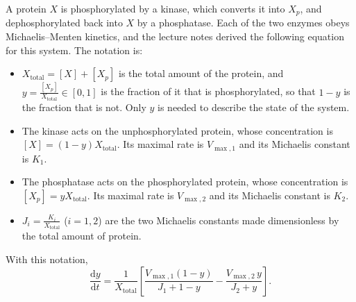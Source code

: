 \documentclass[a4paper,12pt]{article}
\begin{document}
A protein $X$ is phosphorylated by a kinase, which converts it into $X_p$, and dephosphorylated back into $X$ by a phosphatase. Each of the two enzymes obeys Michaelis--Menten kinetics, and the lecture notes derived the following equation for this system. The notation is:
\begin{itemize}
\item $X_{\text{total}} = [X]+[X_p]$ is the total amount of the protein, and $y = \frac{[X_p]}{X_{\text{total}}} \in [0,1]$ is the fraction of it that is phosphorylated, so that $1-y$ is the fraction that is not. Only $y$ is needed to describe the state of the system.
\item The kinase acts on the unphosphorylated protein, whose concentration is $[X] = (1-y)X_{\text{total}}$. Its maximal rate is $V_{\max,1}$ and its Michaelis constant is $K_1$.
\item The phosphatase acts on the phosphorylated protein, whose concentration is $[X_p] = y X_{\text{total}}$. Its maximal rate is $V_{\max,2}$ and its Michaelis constant is $K_2$.
\item $J_i = \frac{K_i}{X_{\text{total}}}$ ($i=1,2$) are the two Michaelis constants made dimensionless by the total amount of protein.
\end{itemize}
With this notation,
\[ \frac{\text{d}y}{\text{d}t} = \frac{1}{X_{\text{total}}} \left[ \frac{V_{\max,1}(1-y)}{J_1+1-y} - \frac{V_{\max,2}\,y}{J_2+y} \right] . \]
\end{document}
